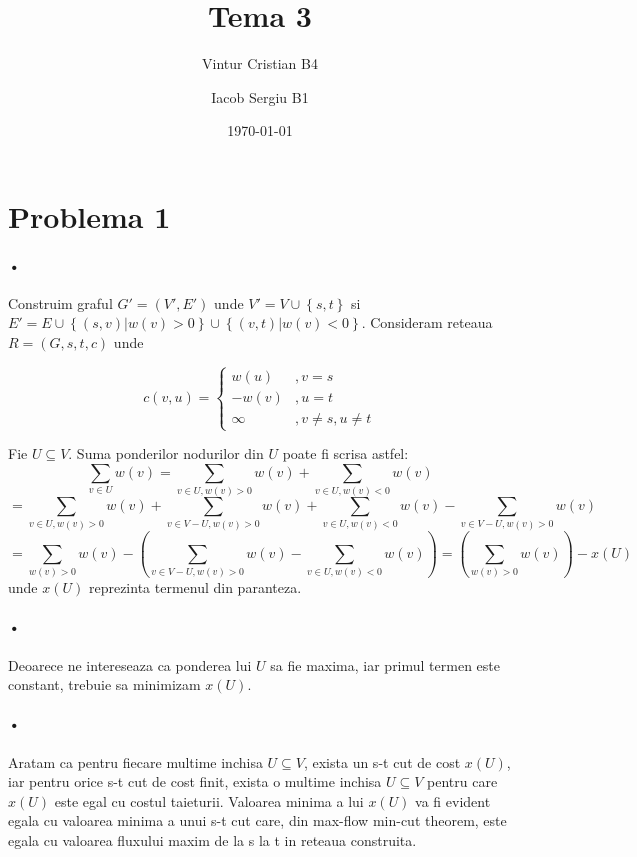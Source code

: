 \documentclass[paper=a4, fontsize=11pt]{scrartcl}
\title{Tema 3}
\author{Vintur Cristian B4 \and Iacob Sergiu B1}
\date{\normalsize\today}
\begin{document}
\maketitle

\section*{Problema 1}

\paragraph{•}
Construim graful $G'=\left(V',E'\right)$ unde $V'=V\cup\left\{s,t\right\}$ si $E'=E\cup\left\{\left(s,v\right)|w\left(v\right)>0\right\}\cup\left\{\left(v,t\right)|w\left(v\right)<0\right\}$. Consideram reteaua $R=\left(G,s,t,c\right)$ unde

\[c(v,u)=\left\{\begin{array}{ll}
	w(u)    &,v=s\\
	-w(v)   &,u=t\\
	\infty  &,v\neq s, u\neq t
\end{array}\right.\]

Fie $U\subseteq V$. Suma ponderilor nodurilor din $U$ poate fi scrisa astfel:
\[ \sum_{v\in U} w(v) = \sum_{v\in U, w(v)>0} w(v) + \sum_{v\in U, w(v)<0} w(v) \]
\[ =\sum_{v\in U, w(v)>0} w(v) + \sum_{v\in V-U, w(v)>0} w(v) + \sum_{v\in U, w(v)<0} w(v) - \sum_{v\in V-U, w(v)>0} w(v) \]
\[ =\sum_{w(v)>0} w(v) - \left(\sum_{v\in V-U, w(v)>0} w(v) - \sum_{v\in U, w(v)<0} w(v)\right) =\left(\sum_{w(v)>0} w(v)\right) - x(U) \]
unde $x(U)$ reprezinta termenul din paranteza.

\paragraph{•}
Deoarece ne intereseaza ca ponderea lui $U$ sa fie maxima, iar primul termen este constant, trebuie sa minimizam $x(U)$.

\paragraph{•}
Aratam ca pentru fiecare multime inchisa $U\subseteq V$, exista un s-t cut de cost $x(U)$, iar pentru orice s-t cut de cost finit, exista o multime inchisa $U\subseteq V$ pentru care $x(U)$ este egal cu costul taieturii. Valoarea minima a lui $x(U)$ va fi evident egala cu valoarea minima a unui s-t cut care, din max-flow min-cut theorem, este egala cu valoarea fluxului maxim de la s la t in reteaua construita.
\end{document}
